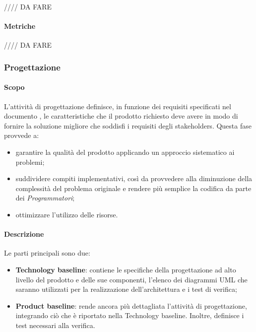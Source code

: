 //// DA FARE

\paragraph{Metriche}

//// DA FARE

\subsubsection{Progettazione}

\paragraph{Scopo}

L'attività di progettazione definisce, in funzione dei requisiti specificati nel documento \AdR, le caratteristiche che il prodotto richiesto deve avere in modo di fornire la soluzione migliore che soddisfi i requisiti degli stakeholders.  Questa fase provvede a:
\begin{itemize}

\item garantire la qualità del prodotto applicando un approccio sistematico ai problemi;

\item suddividere compiti implementativi,  così da provvedere alla diminuzione della complessità del problema originale e rendere più semplice la codifica da parte dei \textit{Programmatori};

\item ottimizzare l'utilizzo delle risorse.

\end{itemize}

\paragraph{Descrizione}

Le parti principali sono due:
\begin{itemize}

\item \textbf{Technology baseline}: contiene le specifiche della progettazione ad alto livello del prodotto e delle sue componenti,  l'elenco dei diagrammi UML che saranno utilizzati per la realizzazione dell'architettura e i test di verifica;
\item \textbf{Product baseline}: rende ancora più dettagliata l'attività di progettazione,  integrando ciò che è riportato nella Technology baseline.  Inoltre,  definisce i test necessari alla verifica.

\end{itemize}

